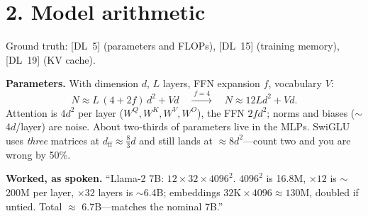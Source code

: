 \section*{2. Model arithmetic}

\noindent Ground truth: [DL~5] (parameters and FLOPs), [DL~15] (training
memory), [DL~19] (KV cache).

\textbf{Parameters.} With dimension $d$, $L$ layers, FFN expansion $f$,
vocabulary $V$:
\[
N \approx L\,(4 + 2f)\,d^{2} + V d
\quad\xrightarrow{\;f=4\;}\quad
N \approx 12 L d^{2} + V d .
\]
Attention is $4d^{2}$ per layer ($W^{Q},W^{K},W^{V},W^{O}$), the FFN $2fd^{2}$;
norms and biases ($\sim$4$d$/layer) are noise. About two-thirds of parameters
live in the MLPs. SwiGLU uses \emph{three} matrices at $d_{\text{ff}} \approx
\tfrac{8}{3}d$ and still lands at $\approx 8d^{2}$---count two and you are wrong
by 50\%.

\textbf{Worked, as spoken.} ``Llama-2 7B: $12 \times 32 \times 4096^{2}$.
$4096^{2}$ is 16.8M, $\times 12$ is $\sim$200M per layer, $\times 32$ layers is
$\sim$6.4B; embeddings $32\text{K} \times 4096 \approx 130$M, doubled if untied.
Total $\approx$ 6.7B---matches the nominal 7B.''

